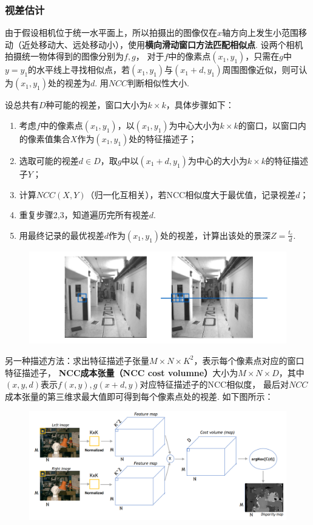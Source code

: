 \documentclass[12pt, a4paper, oneside]{ctexart}
\numberwithin{equation}{section}  %
\theoremstyle{definition}
\def\del{\vspace{-1.5ex}}   %
\begin{document}
\subsubsection{视差估计}
由于假设相机位于统一水平面上，所以拍摄出的图像仅在$x$轴方向上发生小范围移动（近处移动大、远处移动小），使用\textbf{横向滑动窗口方法匹配相似点}. 
设两个相机拍摄统一物体得到的图像分别为$f,g$，
对于$f$中的像素点$(x_1,y_1)$，只需在$g$中$y=y_1$的水平线上寻找相似点，若$(x_1,y_1)$与$(x_1+d,y_1)$周围图像近似，则可认为$(x_1,y_1)$处的视差为$d$.
用$NCC$判断相似性大小.

设总共有$D$种可能的视差，窗口大小为$k\times k$，具体步骤如下：
\begin{enumerate}
    \item 考虑$f$中的像素点$(x_1,y_1)$，以$(x_1,y_1)$为中心大小为$k\times k$的窗口，以窗口内的像素值集合$X$作为$(x_1,y_1)$处的特征描述子；
    \item 选取可能的视差$d\in D$，取$g$中以$(x_1+d,y_1)$为中心的大小为$k\times k$的特征描述子$Y$；
    \item 计算$NCC(X,Y)$（归一化互相关），若NCC相似度大于最优值，记录视差$d$；
    \item 重复步骤2,3，知道遍历完所有视差$d$.
    \item 用最终记录的最优视差$d$作为$(x_1,y_1)$处的视差，计算出该处的景深$Z = \frac{t_c}{d}$.
\end{enumerate}
\begin{figure}[htbp]
    \vspace{-0.5cm}
    \centering
    \includegraphics[scale=0.6]{移动窗口视差估计.png}
\end{figure}

另一种描述方法：求出特征描述子张量$M\times N\times K^2$，表示每个像素点对应的窗口特征描述子，
\textbf{NCC成本张量（NCC cost volumne）}大小为$M\times N\times D$，其中$(x,y,d)$表示$f(x,y),g(x+d,y)$对应特征描述子的NCC相似度，
最后对$NCC$成本张量的第三维求最大值即可得到每个像素点处的视差. 如下图所示：\del
\begin{figure}[htbp]
    \hspace{-0.7cm}
    \includegraphics[scale=0.6]{视差估计.png}
\end{figure}
\end{document}
